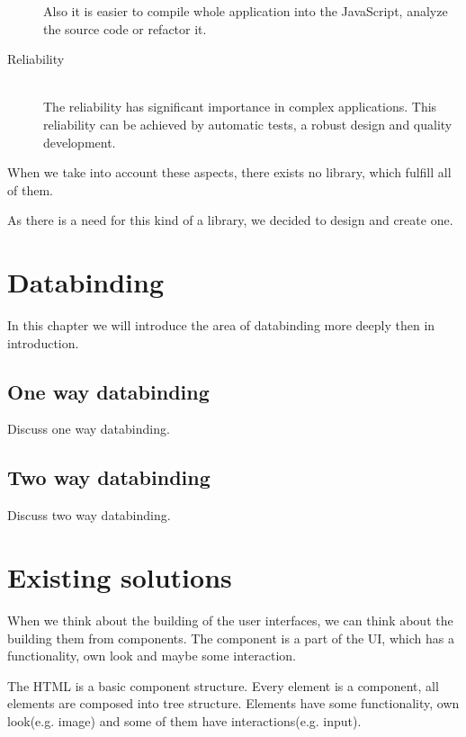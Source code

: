 \documentclass[oneside, 12pt]{book}
\begin{document}
\begin{description}
		Also it is easier to compile whole application into the JavaScript, analyze the source code or refactor it.
	\item[Reliability] \hfill \\
		The reliability has significant importance in complex applications. 
		This reliability can be achieved by automatic tests, a robust design and quality development. 
\end{description}

When we take into account these aspects, there exists no library, which fulfill all of them.

As there is a need for this kind of a library, we decided to design and create one. 


\chapter{Databinding}\label{chap:databinding}

In this chapter we will introduce the area of databinding more deeply then in introduction.

\section{One way databinding}\label{sec:onewaydatabinding}

Discuss one way databinding.

\section{Two way databinding}

Discuss two way databinding.


\chapter{Existing solutions}\label{chap:existing}

When we think about the building of the user interfaces, we can think about the building them from components.
The component is a part of the UI, which has a functionality, own look and maybe some interaction.

The HTML is a basic component structure. Every element is a component, all elements are composed into tree structure. 
Elements have some functionality, own look(e.g. image) and some of them have interactions(e.g. input).
\end{document}
